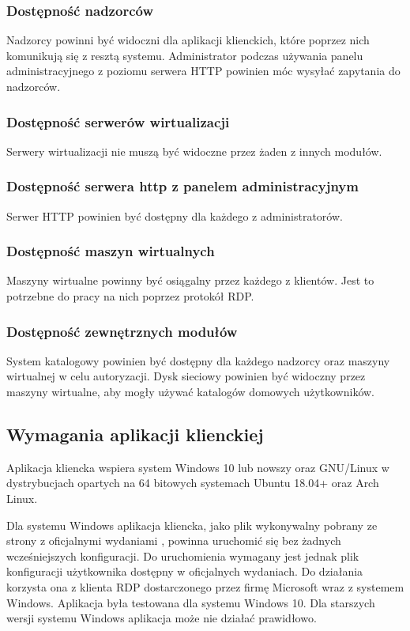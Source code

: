 \documentclass[../opis-rozwiazania.tex]{subfiles}
\begin{document}
\subsubsection{Dostępność nadzorców}
Nadzorcy powinni być widoczni dla aplikacji klienckich, które poprzez nich komunikują się z resztą systemu.
Administrator podczas używania panelu administracyjnego z poziomu serwera HTTP powinien móc wysyłać zapytania do nadzorców.

\subsubsection{Dostępność serwerów wirtualizacji}
Serwery wirtualizacji nie muszą być widoczne przez żaden z innych modułów.

\subsubsection{Dostępność serwera http z panelem administracyjnym}
Serwer HTTP powinien być dostępny dla każdego z administratorów.

\subsubsection{Dostępność maszyn wirtualnych}
Maszyny wirtualne powinny być osiągalny przez każdego z klientów.
Jest to potrzebne do pracy na nich poprzez protokół RDP.

\subsubsection{Dostępność zewnętrznych modułów}
System katalogowy powinien być dostępny dla każdego nadzorcy oraz maszyny wirtualnej w celu autoryzacji.
Dysk sieciowy powinien być widoczny przez maszyny wirtualne, aby mogły używać katalogów domowych użytkowników.

\subsection{Wymagania aplikacji klienckiej}
Aplikacja kliencka wspiera system Windows 10 lub nowszy oraz GNU/Linux w dystrybucjach opartych na 64 bitowych systemach Ubuntu 18.04+ oraz Arch Linux.

Dla systemu Windows aplikacja kliencka, jako plik wykonywalny pobrany ze strony z oficjalnymi wydaniami \parencite{ocd-client-releases}, powinna uruchomić się bez żadnych wcześniejszych konfiguracji. Do uruchomienia wymagany jest jednak plik konfiguracji użytkownika dostępny w oficjalnych wydaniach.
Do działania korzysta ona z klienta RDP dostarczonego przez firmę Microsoft wraz z systemem Windows.
Aplikacja była testowana dla systemu Windows 10.
Dla starszych wersji systemu Windows aplikacja może nie działać prawidłowo.
\end{document}
